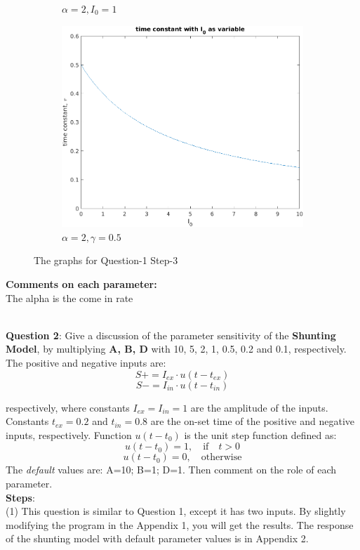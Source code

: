 \documentclass[12pt,letterpaper]{article}
\theoremstyle{definition}
\begin{document}
\begin{figure}[h]
\begin{subfigure}[b]{0.3\textwidth}
         \caption{$\alpha = 2, I_0 = 1$}
         \label{fig:three sin x}
     \end{subfigure}
     \begin{subfigure}[b]{0.3\textwidth}
         \centering
         \includegraphics[width=\textwidth]{picture/Figure_1-3I0.png}
         \caption{$\alpha = 2, \gamma = 0.5$}
         \label{fig:five over x}
     \end{subfigure}
        \caption{The graphs for Question-1 Step-3}
        \label{fig:fourgraphsforq3}
\end{figure}

\textbf{Comments on each parameter:}
\\ The alpha is the come in rate

\\
\clearpage
\pagebreak
\textbf{Question 2}: Give a discussion of the parameter sensitivity of the \textbf{Shunting Model}, by multiplying\textbf{ A, B, D} with 10, 5, 2, 1, 0.5, 0.2 and 0.1, respectively. The positive and negative inputs are:
\[S+ = I_{ex} \cdot u(t-t_{ex})\]
\[S- = I_{in} \cdot u(t-t_{in})\]

respectively, where constants $I_{ex} = I_{in} = 1$ are the amplitude of the inputs. Constants $t_{ex} = 0.2$ and $t_{in} = 0.8$ are the on-set time of the positive and negative inputs, respectively.
Function $u(t-t_0)$ is the unit step function defined as:
\[u(t- t_0) = 1, \quad \mathrm{if \quad} t>0\]
\[u(t- t_0) = 0, \quad \mathrm{otherwise}\] The \textit{default} values are: A=10; B=1; D=1. 
Then comment on the role of each parameter.
\\
\textbf{Steps}:
\\
(1) This question is similar to Question 1, except it has two inputs. By slightly modifying the program in the Appendix 1, you will get the results. The response of the shunting model with default parameter values is in Appendix 2.
\end{document}
